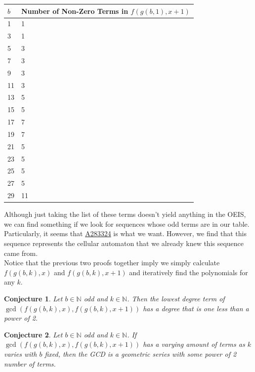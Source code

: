 \documentclass{article}
\newtheorem{conjecture}{Conjecture}
\newcommand{\N}{\mathbb{N}}
\begin{document}
	\begin{table}[H]
		\centering
		\begin{tabular}{|l||l|}
			\hline
			$b$ & Number of Non-Zero Terms in $f(g(b,1),x+1)$ \\
			\hline\hline
			1 & 1 \\
			\hline
			3 & 1 \\
			\hline
			5 & 3 \\
			\hline
			7 & 3 \\
			\hline
			9 & 3 \\
			\hline
			11 & 3 \\
			\hline
			13 & 5 \\
			\hline
			15 & 5 \\
			\hline
			17 & 7 \\
			\hline
			19 & 7 \\
			\hline
			21 & 5 \\
			\hline
			23 & 5 \\
			\hline
			25 & 5 \\
			\hline
			27 & 5 \\
			\hline
			29 & 11 \\
			\hline
		\end{tabular}
	\end{table}
	Although just taking the list of these terms doesn't yield anything in the OEIS, we can find something if we look for sequences whose odd terms are in our table.
	Particularly, it seems that \href{https://oeis.org/A283324}{A283324} is what we want.
	However, we find that this sequence represents the cellular automaton that we already knew this sequence came from. \\
	
	Notice that the previous two proofs together imply we simply calculate $f(g(b,k),x)$ and $f(g(b,k),x+1)$ and iteratively find the polynomials for any $k$.

	\newpage
	\begin{conjecture}
		Let $b \in \N$ odd and $k \in \N$. 
		Then the lowest degree term of $\gcd\left(f(g(b,k),x),f(g(b,k),x+1)\right)$ has a degree that is one less than a power of 2.
	\end{conjecture}

	\begin{conjecture}
		Let $b \in \N$ odd and $k \in \N$.
		If $\gcd\left(f(g(b,k),x),f(g(b,k),x+1)\right)$ has a varying amount of terms as $k$ varies with $b$ fixed, then the GCD is a geometric series with some power of 2 number of terms.
	\end{conjecture}
\end{document}
